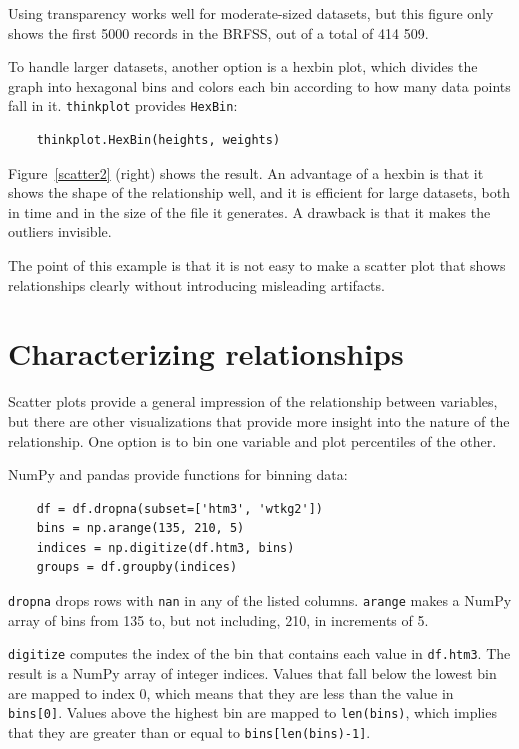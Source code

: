 \documentclass[12pt]{book}
\begin{document}
Using transparency works well for moderate-sized datasets, but this
figure only shows the first 5000 records in the BRFSS, out of a total
of 414 509.

To handle larger datasets, another option is a hexbin plot, which
divides the graph into hexagonal bins and colors each bin according to
how many data points fall in it.  {\tt thinkplot} provides 
{\tt HexBin}:
%
\begin{verbatim}
    thinkplot.HexBin(heights, weights)
\end{verbatim}
%
Figure~\ref{scatter2} (right) shows the result.  An advantage of a
hexbin is that it shows the shape of the relationship well, and it is
efficient for large datasets, both in time and in the size of the file
it generates.  A drawback is that it makes the outliers invisible.

The point of this example is that it is
not easy to make a scatter plot that shows relationships clearly
without introducing misleading artifacts.


\section{Characterizing relationships}
\label{characterizing}

Scatter plots provide a general impression of the relationship between
variables, but there are other visualizations that provide more
insight into the nature of the relationship.  One option is to bin one
variable and plot percentiles of the other.

NumPy and pandas provide functions for binning data:

\begin{verbatim}
    df = df.dropna(subset=['htm3', 'wtkg2'])
    bins = np.arange(135, 210, 5)
    indices = np.digitize(df.htm3, bins)
    groups = df.groupby(indices)
\end{verbatim}

{\tt dropna} drops rows with {\tt nan} in any of the listed columns.
{\tt arange} makes a NumPy array of bins from 135 to, but not including,
210, in increments of 5.

{\tt digitize} computes the index of the bin that contains each value
in {\tt df.htm3}.  The result is a NumPy array of integer indices.
Values that fall below the lowest bin are mapped to index 0, which means that they are less than the value in {\tt bins[0]}.  
Values above the highest bin are mapped to {\tt len(bins)}, which implies that they are greater than or equal to {\tt bins[len(bins)-1]}.
\end{document}
